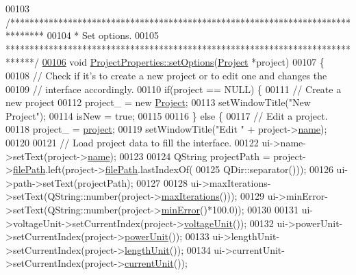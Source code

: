 \begin{DoxyCode}
00103 \textcolor{comment}{/*******************************************************************************}
00104 \textcolor{comment}{ * Set options.}
00105 \textcolor{comment}{ ******************************************************************************/}
\hypertarget{projectproperties_8cpp_source_l00106}{}\hyperlink{group___window_gaa9b9347f570a52e17e4debb4f03be625}{00106} \textcolor{keywordtype}{void} \hyperlink{group___window_gaa9b9347f570a52e17e4debb4f03be625}{ProjectProperties::setOptions}(\hyperlink{class_project}{Project} *project)
00107 \{
00108   \textcolor{comment}{// Check if it's to create a new project or to edit one and changes the}
00109   \textcolor{comment}{// interface accordingly.}
00110   \textcolor{keywordflow}{if}(project == NULL) \{
00111     \textcolor{comment}{// Create a new project}
00112     project\_ = \textcolor{keyword}{new} \hyperlink{class_project}{Project};
00113     setWindowTitle(\textcolor{stringliteral}{"New Project"});
00114     isNew = \textcolor{keyword}{true};
00115 
00116   \} \textcolor{keywordflow}{else} \{
00117     \textcolor{comment}{// Edit a project.}
00118     project\_ = \hyperlink{group___window_ga241ef3f82071d6091e4addbda53a634c}{project};
00119     setWindowTitle(\textcolor{stringliteral}{"Edit "} + project->\hyperlink{class_project_a82dd2d1bc38f9fd08c9a811fcaa76b38}{name});
00120 
00121     \textcolor{comment}{// Load project data to fill the interface.}
00122     ui->name->setText(project->\hyperlink{class_project_a82dd2d1bc38f9fd08c9a811fcaa76b38}{name});
00123 
00124     QString projectPath = project->\hyperlink{class_project_a79f30adcefd0b72bd4ac7db724bc9531}{filePath}.left(project->\hyperlink{class_project_a79f30adcefd0b72bd4ac7db724bc9531}{filePath}.lastIndexOf(
00125                             QDir::separator()));
00126     ui->path->setText(projectPath);
00127 
00128     ui->maxIterations->setText(QString::number(project->\hyperlink{class_project_ab9d6426396a75f2fcaeadcddcd0fac64}{maxIterations}()));
00129     ui->minError->setText(QString::number(project->\hyperlink{class_project_a457ed8d3b0ea5816f928977509f69a34}{minError}()*100.0));
00130 
00131     ui->voltageUnit->setCurrentIndex(project->\hyperlink{class_project_a93b928093072ba15c24693b03a934e4e}{voltageUnit}());
00132     ui->powerUnit->setCurrentIndex(project->\hyperlink{class_project_a2a1bc35358d6189695d6e5b7dd547ffd}{powerUnit}());
00133     ui->lengthUnit->setCurrentIndex(project->\hyperlink{class_project_a40cd2f59a4a708897e5997942c046f4d}{lengthUnit}());
00134     ui->currentUnit->setCurrentIndex(project->\hyperlink{class_project_a0d22341fcc068be743b776df0a02f55e}{currentUnit}());

\end{DoxyCode}
